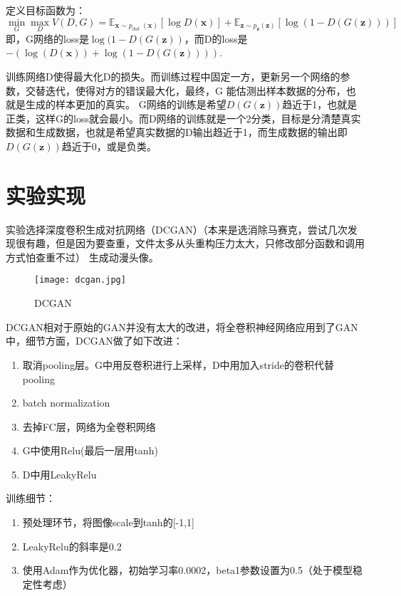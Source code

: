 \documentclass[a4paper,AutoFakeBold,AutoFakeSlant]{ctexart}
\begin{document}
定义目标函数为：
\begin{equation}
  \min _{G} \max _{D} V(D, G)=\mathbb{E}_{\boldsymbol{x} \sim p_{\text {dut }}(\boldsymbol{x})}[\log D(\boldsymbol{x})]+\mathbb{E}_{\boldsymbol{z} \sim p_{\boldsymbol{z}}(\boldsymbol{z})}[\log (1-D(G(\boldsymbol{z})))]
\end{equation}
即，G网络的loss是$\log (1-D(G(\boldsymbol{z}))$，而D的loss是$-(\log (D(\boldsymbol{x})) + \log (1-D(G(\boldsymbol{z}))))$. 

训练网络D使得最大化D的损失。而训练过程中固定一方，更新另一个网络的参数，交替迭代，使得对方的错误最大化，最终，G 能估测出样本数据的分布，也就是生成的样本更加的真实。
G网络的训练是希望$D(G(\boldsymbol{z}))$趋近于1，也就是正类，这样G的loss就会最小。而D网络的训练就是一个2分类，目标是分清楚真实数据和生成数据，也就是希望真实数据的D输出趋近于1，而生成数据的输出即$D(G(\boldsymbol{z}))$趋近于0，或是负类。

\section{实验实现}
实验选择深度卷积生成对抗网络（DCGAN）（本来是选消除马赛克，尝试几次发现很有趣，但是因为要查重，文件太多从头重构压力太大，只修改部分函数和调用方式怕查重不过）
生成动漫头像。
\begin{figure}[htbp]
  \centering
  \texttt{[image: dcgan.jpg]}
  \caption{DCGAN}
\end{figure}

DCGAN相对于原始的GAN并没有太大的改进，将全卷积神经网络应用到了GAN中，细节方面，DCGAN做了如下改进：
\begin{enumerate}
  \item 取消pooling层。G中用反卷积进行上采样，D中用加入stride的卷积代替pooling
  \item batch normalization
  \item 去掉FC层，网络为全卷积网络
  \item G中使用Relu(最后一层用tanh)
  \item D中用LeakyRelu
\end{enumerate}

训练细节：
\begin{enumerate}
  \item 预处理环节，将图像scale到tanh的[-1,1]
  \item LeakyRelu的斜率是0.2
  \item 使用Adam作为优化器，初始学习率0.0002，beta1参数设置为0.5（处于模型稳定性考虑）
\end{enumerate}
\end{document}
